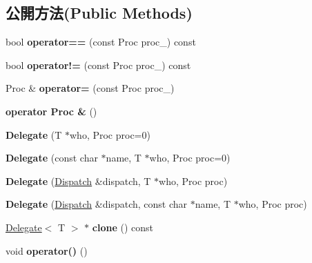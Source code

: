 \subsection*{公開方法(Public Methods)}
\begin{DoxyCompactItemize}
\item 
bool {\bfseries operator==} (const Proc proc\+\_\+) const \hypertarget{class_magnum_1_1_delegate_accfed79f6dd28efb8ebf3e8469907363}{}\label{class_magnum_1_1_delegate_accfed79f6dd28efb8ebf3e8469907363}

\item 
bool {\bfseries operator!=} (const Proc proc\+\_\+) const \hypertarget{class_magnum_1_1_delegate_adf6395ac774f10ee180eb16b03e546dd}{}\label{class_magnum_1_1_delegate_adf6395ac774f10ee180eb16b03e546dd}

\item 
Proc \& {\bfseries operator=} (const Proc proc\+\_\+)\hypertarget{class_magnum_1_1_delegate_a1d342034c9be2e51f574ca34597538c4}{}\label{class_magnum_1_1_delegate_a1d342034c9be2e51f574ca34597538c4}

\item 
{\bfseries operator Proc \&} ()\hypertarget{class_magnum_1_1_delegate_afd398ff8104efa7918a967fc70d4e958}{}\label{class_magnum_1_1_delegate_afd398ff8104efa7918a967fc70d4e958}

\item 
{\bfseries Delegate} (T $\ast$who, Proc proc=0)\hypertarget{class_magnum_1_1_delegate_a5f6adde7423bab19c35c83bffa69b422}{}\label{class_magnum_1_1_delegate_a5f6adde7423bab19c35c83bffa69b422}

\item 
{\bfseries Delegate} (const char $\ast$name, T $\ast$who, Proc proc=0)\hypertarget{class_magnum_1_1_delegate_a6f302152885458bf82f5a297cc2a031c}{}\label{class_magnum_1_1_delegate_a6f302152885458bf82f5a297cc2a031c}

\item 
{\bfseries Delegate} (\hyperlink{class_magnum_1_1_dispatch}{Dispatch} \&dispatch, T $\ast$who, Proc proc)\hypertarget{class_magnum_1_1_delegate_a10946bed63b5e66968fca3faae473ff6}{}\label{class_magnum_1_1_delegate_a10946bed63b5e66968fca3faae473ff6}

\item 
{\bfseries Delegate} (\hyperlink{class_magnum_1_1_dispatch}{Dispatch} \&dispatch, const char $\ast$name, T $\ast$who, Proc proc)\hypertarget{class_magnum_1_1_delegate_a0e13705dacf72a658750f82f804edd82}{}\label{class_magnum_1_1_delegate_a0e13705dacf72a658750f82f804edd82}

\item 
\hyperlink{class_magnum_1_1_delegate}{Delegate}$<$ T $>$ $\ast$ {\bfseries clone} () const \hypertarget{class_magnum_1_1_delegate_a4910c1919591f4d5cfd1054e39d267c3}{}\label{class_magnum_1_1_delegate_a4910c1919591f4d5cfd1054e39d267c3}

\item 
void {\bfseries operator()} ()\hypertarget{class_magnum_1_1_delegate_aad0efe127e8fa96e6d47b8115e619cd5}{}\label{class_magnum_1_1_delegate_aad0efe127e8fa96e6d47b8115e619cd5}

\end{DoxyCompactItemize}
